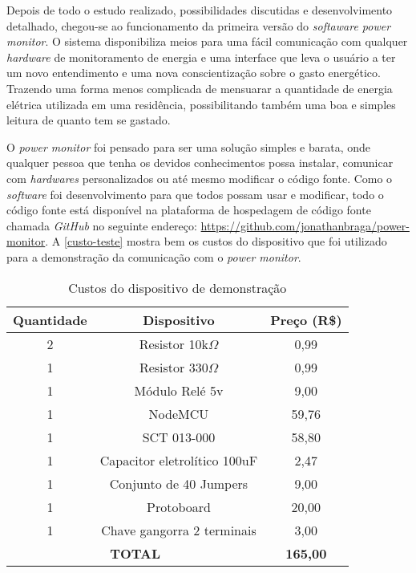 Depois de todo o estudo realizado, possibilidades discutidas e desenvolvimento detalhado, chegou-se ao  funcionamento da primeira versão
do \textit{softaware power monitor}. O sistema disponibiliza meios para uma fácil comunicação com qualquer \textit{hardware} de monitoramento
de energia e uma interface que leva o usuário a ter um novo entendimento e uma nova conscientização sobre o gasto energético. Trazendo uma forma menos
complicada de mensuarar a quantidade de energia elétrica utilizada em uma residência, possibilitando também uma boa e simples leitura de quanto tem se gastado.

O \textit{power monitor} foi pensado para ser uma solução simples e barata, onde qualquer pessoa que tenha os devidos conhecimentos possa 
instalar, comunicar com \textit{hardwares} personalizados ou até mesmo modificar o código fonte. Como o \textit{software} foi desenvolvimento 
para que todos possam usar e modificar, todo o código fonte está disponível na plataforma de hospedagem de código fonte chamada 
\textit{GitHub} no seguinte endereço: \url{https://github.com/jonathanbraga/power-monitor}{}. A \autoref{custo-teste} mostra bem os 
custos do dispositivo que foi utilizado para a demonstração da comunicação com o \textit{power monitor}.


\begin{table}[!ht]
	\centering
	\begin{tabular}{ccc}
		\hline
		\textbf{Quantidade} & \textbf{Dispositivo}               & \textbf{Preço (R\$)}                 \\ \hline
		\rowcolor[HTML]{DDDDDD} 
		2                   & Resistor 10k$\Omega$ & 0,99                                 \\
		1                   & Resistor 330$\Omega$ & 0,99                                 \\
		\rowcolor[HTML]{DDDDDD} 
		1                   & Módulo Relé 5v                     & 9,00                                 \\
		1                   & NodeMCU                            & 59,76                                \\
		\rowcolor[HTML]{DDDDDD} 
		1                   & SCT 013-000                        & 58,80                                \\
		1                   & Capacitor eletrolítico 100uF       & 2,47                                 \\
		\rowcolor[HTML]{DDDDDD} 
		1                   & Conjunto de 40 Jumpers             & 9,00                                 \\
		1                   & Protoboard             & 20,00                                 \\
		1                   & Chave gangorra 2 terminais         & 3,00                                 \\ \hline
		\multicolumn{2}{|c|}{\textbf{TOTAL}}                     & \multicolumn{1}{c|}{\textbf{165,00}} \\ \hline
	\end{tabular}
	\caption{Custos do dispositivo de demonstração}
	\label{custo-teste}
\end{table}